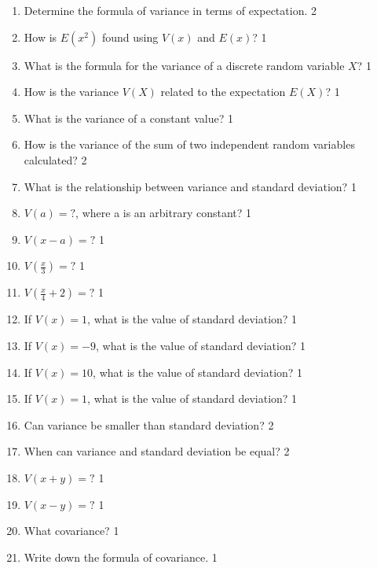 \documentclass[a4paper,oneside, margin=1.4in]{book}
\begin{document}
\begin{enumerate}
 \item Determine the formula of variance in terms of expectation. \hfill 2

\item How is \( E(x^2) \) found using \( V(x) \) and \( E(x) \)? \hfill 1

\item What is the formula for the variance of a discrete random variable \( X \)? \hfill 1

\item How is the variance \( V(X) \) related to the expectation \( E(X) \)? \hfill 1

\item What is the variance of a constant value? \hfill 1

\item How is the variance of the sum of two independent random variables calculated? \hfill 2

\item What is the relationship between variance and standard deviation? \hfill 1

\item $V(a) = ?$, where a is an arbitrary constant?  \hfill 1

\item $V(x-a) = ?$  \hfill 1

\item $V(\frac x3) = ?$  \hfill 1

\item $V(\frac x4 + 2) = ?$  \hfill 1

\item If $V(x) = 1$, what is the value of standard deviation? \hfill 1

\item If $V(x) = -9$, what is the value of standard deviation? \hfill 1

\item If $V(x) = 10$, what is the value of standard deviation? \hfill 1

\item If $V(x) = 1$, what is the value of standard deviation? \hfill 1

\item Can variance be smaller than standard deviation? \hfill 2

\item When can variance and standard deviation be equal? \hfill 2

\item $V(x + y)=?$ \hfill 1

\item $V(x - y)=?$ \hfill 1

\item What covariance? \hfill 1

\item Write down the formula of covariance. \hfill 1


\end{enumerate}
\end{document}
